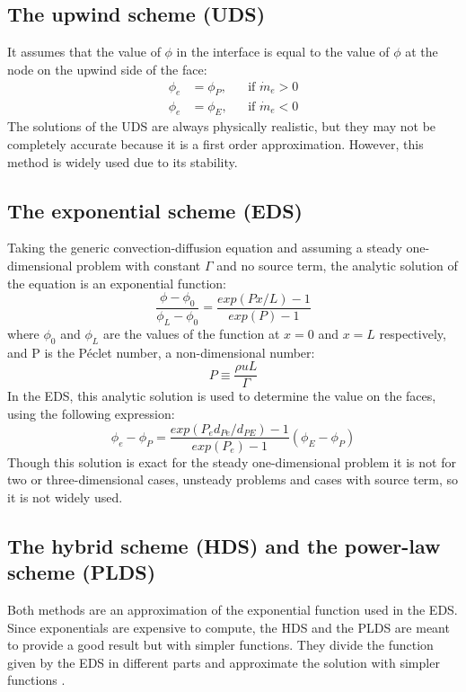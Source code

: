 \subsection{The upwind scheme (UDS)}
It assumes that the value of $\phi$ in the interface is equal to the value of $\phi$ at the node on the upwind side of the face:
\begin{equation}
\begin{aligned}
\phi_ {e} &=\phi_{P},&&\text{if $\dot{m}_{e}>0$}\\    \phi_ {e} &=\phi_{E},&&\text{if $\dot{m}_{e}<0$}
\end{aligned}
\end{equation}
The solutions of the UDS are always physically realistic, but they may not be completely accurate because it is a first order approximation. However, this method is widely used due to its stability.

\subsection{The exponential scheme (EDS)}
Taking the generic convection-diffusion equation and assuming a steady one-dimensional problem with constant $\Gamma$ and no source term, the analytic solution of the equation is an exponential function:
\begin{equation}
\frac{\phi-\phi_{0}}{\phi_{L}-\phi_{0}}=\frac{exp\left(Px/L\right)-1}{exp\left(P\right)-1}
\end{equation}
where $\phi_{0}$ and $\phi_{L}$ are the values of the function at $x=0$ and $x=L$ respectively, and P is the Péclet number, a non-dimensional number:
\begin{equation}
P\equiv\frac{\rho uL}{\Gamma}
\end{equation}
In the EDS, this analytic solution is used to determine the value on the faces, using the following expression:
\begin{equation}
\phi_{e}-\phi_{P}=\frac{exp\left(P_{e}d_{Pe}/d_{PE}\right)-1}{exp\left(P_{e}\right)-1}\left(\phi_{E}-\phi_{P}\right)
\end{equation}
Though this solution is exact for the steady one-dimensional problem it is not for two or three-dimensional cases, unsteady problems and cases with source term, so it is not widely used.

\subsection{The hybrid scheme (HDS) and the power-law scheme (PLDS)}
Both methods are an approximation of the exponential function used in the EDS. Since exponentials are expensive to compute, the HDS and the PLDS are meant to provide a good result but with simpler functions. They divide the function given by the EDS in different parts and approximate the solution with simpler functions \cite{Patankar1980}.